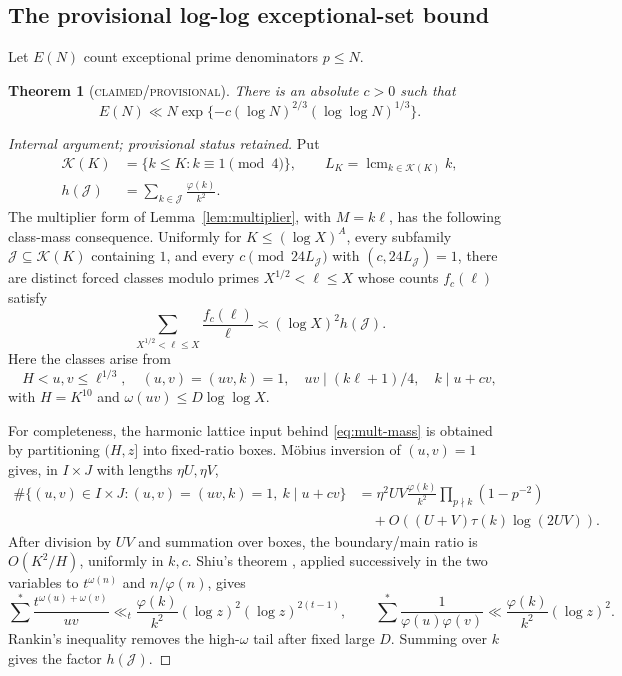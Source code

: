 \documentclass[10pt,reqno]{amsart}
\newtheorem{theorem}{Theorem}[section]
\theoremstyle{definition}
\newcommand{\lcm}{\operatorname {lcm}}
\newcommand{\1}{\mathbf 1}
\begin{document}
\subsection{The provisional log-log exceptional-set bound}
Let $E(N)$ count exceptional prime denominators $p\leq N$.
\begin{theorem}[\textsc{claimed/provisional}]\label{thm:record}
There is an absolute $c>0$ such that
\[
 E(N)\ll N\exp\{-c(\log N)^{2/3}(\log\log N)^{1/3}\}.
\]
\end{theorem}
\begin{proof}[Internal argument; provisional status retained]
Put
\[
 \begin{aligned}
 \mathcal K(K)&=\{k\leq K:k\equiv1\pmod4\},\qquad
 L_K=\lcm_{k\in\mathcal K(K)}k,\\
 h(\mathcal J)&=\sum_{k\in\mathcal J}\frac{\varphi(k)}{k^2}.
 \end{aligned}
\]
The multiplier form of Lemma~\ref{lem:multiplier}, with $M=k\ell$, has the following class-mass consequence.  Uniformly for $K\leq(\log X)^A$, every subfamily $\mathcal J\subseteq\mathcal K(K)$ containing $1$, and every $c\pmod{24L_\mathcal J}$ with $(c,24L_\mathcal J)=1$, there are distinct forced classes modulo primes $X^{1/2}<\ell\leq X$ whose counts $f_c(\ell)$ satisfy
\begin{equation}\label{eq:mult-mass}
 \sum_{X^{1/2}<\ell\leq X}\frac{f_c(\ell)}\ell
 \asymp(\log X)^2h(\mathcal J).
\end{equation}
Here the classes arise from
\[
 H<u,v\leq\ell^{1/3},\quad (u,v)=(uv,k)=1,
 \quad uv\mid(k\ell+1)/4,
 \quad k\mid u+cv,
\]
with $H=K^{10}$ and $\omega(uv)\leq D\log\log X$.

For completeness, the harmonic lattice input behind \eqref{eq:mult-mass} is obtained by partitioning $(H,z]$ into fixed-ratio boxes.  M\"obius inversion of $(u,v)=1$ gives, in $I\times J$ with lengths $\eta U,\eta V$,
\[
 \begin{aligned}
 \#\{(u,v)\in I\times J:(u,v)=(uv,k)=1,\ k\mid u+cv\}
 &=\eta^2UV\frac{\varphi(k)}{k^2}
   \prod_{p\nmid k}(1-p^{-2})\\
 &\quad+O((U+V)\tau(k)\log(2UV)).
 \end{aligned}
\]
After division by $UV$ and summation over boxes, the boundary/main ratio is $O(K^2/H)$, uniformly in $k,c$.  Shiu's theorem \cite{Shiu}, applied successively in the two variables to $t^{\omega(n)}$ and $n/\varphi(n)$, gives
\[
 \sum^*\frac{t^{\omega(u)+\omega(v)}}{uv}
 \ll_t\frac{\varphi(k)}{k^2}(\log z)^2(\log z)^{2(t-1)},
 \qquad
 \sum^*\frac1{\varphi(u)\varphi(v)}
 \ll\frac{\varphi(k)}{k^2}(\log z)^2.
\]
Rankin's inequality removes the high-$\omega$ tail after fixed large $D$.  Summing over $k$ gives the factor $h(\mathcal J)$.


\end{proof}
\end{document}
